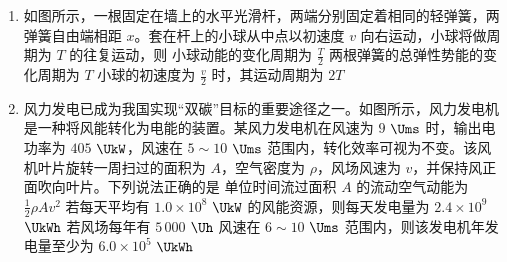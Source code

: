 \documentclass[\gkver]{gaokaozhenti}
\begin{document}
\begin{enumerate}
{	以其中一斜杆为研究对象，其受力如图所示


	可知每根斜杆受到地面的作用力应与 $F$ 平衡，即大小为 $\frac{\sqrt 3}{6}G$，每根斜杆受到地面的摩擦力为 $f = F\sin30\Udu = \frac{\sqrt 3}{12}G$。

	B 正确，ACD 错误；

	故选 B。
}

\item
如图所示，一根固定在墙上的水平光滑杆，两端分别固定着相同的轻弹簧，两弹簧自由端相距 $x$。套在杆上的小球从中点以初速度 $v$ 向右运动，小球将做周期为 $T$ 的往复运动，则
{小球动能的变化周期为 $\frac{T}{2}$}
{两根弹簧的总弹性势能的变化周期为 $T$}
{小球的初速度为 $\frac{v}{2}$ 时，其运动周期为 $2T$}


\item
风力发电已成为我国实现“双碳”目标的重要途径之一。如图所示，风力发电机是一种将风能转化为电能的装置。某风力发电机在风速为 $9$ $\Ums$ 时，输出电功率为 $405$ $\UkW$，风速在 $5\sim10$ $\Ums$ 范围内，转化效率可视为不变。该风机叶片旋转一周扫过的面积为 $A$，空气密度为 $\rho$，风场风速为 $v$，并保持风正面吹向叶片。下列说法正确的是
{单位时间流过面积 $A$ 的流动空气动能为 $\frac{1}{2}\rho Av^{2}$}
{若每天平均有 $1.0\times10^{8}$ $\UkW$ 的风能资源，则每天发电量为 $2.4\times10^{9}$ $\UkWh$}
{若风场每年有 $5\,000$ $\Uh$ 风速在 $6\sim10$ $\Ums$ 范围内，则该发电机年发电量至少为 $6.0\times10^{5}$ $\UkWh$}


\end{enumerate}
\end{document}
